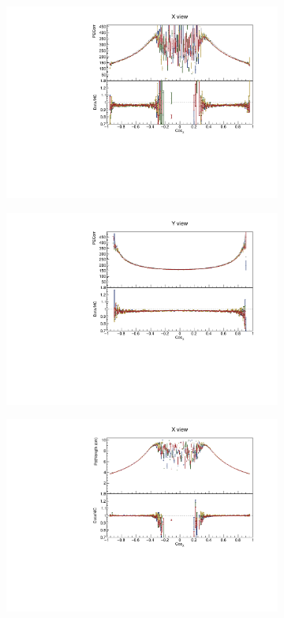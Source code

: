 \begin{figure}[!ht]
\begin{subfigure}{0.5\textwidth}
  \end{subfigure}
  \begin{subfigure}{0.5\textwidth}
    \includegraphics[width=\linewidth]{PlotsAngularDistribution/pecorr_cosx_x.pdf}
  \end{subfigure}
  \begin{subfigure}{0.5\textwidth}
    \includegraphics[width=\linewidth]{PlotsAngularDistribution/pecorr_cosx_y.pdf}
  \end{subfigure}
  \begin{subfigure}{0.5\textwidth}
    \includegraphics[width=\linewidth]{PlotsAngularDistribution/cm_cosx_x.pdf}

\end{subfigure}
\end{figure}
